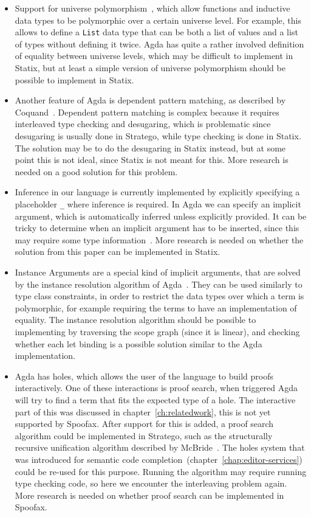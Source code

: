 \begin{itemize}
	\item Support for universe polymorphism~\cite[Universe Levels]{agda}, which allow functions and inductive data types to be polymorphic over a certain universe level. For example, this allows to define a \verb|List| data type that can be both a list of values and a list of types without defining it twice. Agda has quite a rather involved definition of equality between universe levels, which may be difficult to implement in Statix, but at least a simple version of universe polymorphism should be possible to implement in Statix.
	\item Another feature of Agda is dependent pattern matching, as described by Coquand~\cite{patternmatching}. Dependent pattern matching is complex because it requires interleaved type checking and desugaring, which is problematic since desugaring is usually done in Stratego, while type checking is done in Statix. The solution may be to do the desugaring in Statix instead, but at some point this is not ideal, since Statix is not meant for this. More research is needed on a good solution for this problem.
	\item Inference in our language is currently implemented by explicitly specifying a placeholder \verb|_| where inference is required. In Agda we can specify an implicit argument, which is automatically inferred unless explicitly provided. It can be tricky to determine when an implicit argument has to be inserted, since this may require some type information~\cite{implicit_arguments}. More research is needed on whether the solution from this paper can be implemented in Statix.
	\item Instance Arguments are a special kind of implicit arguments, that are solved by the instance resolution algorithm of Agda~\cite[Instance Arguments]{agda}. They can be used similarly to type class constraints, in order to restrict the data types over which a term is polymorphic, for example requiring the terms to have an implementation of equality. The instance resolution algorithm should be possible to implementing by traversing the scope graph (since it is linear), and checking whether each let binding is a possible solution similar to the Agda implementation. 
	\item Agda has holes, which allows the user of the language to build proofs interactively. One of these interactions is proof search, when triggered Agda will try to find a term that fits the expected type of a hole. The interactive part of this was discussed in chapter~\ref{ch:relatedwork}, this is not yet supported by Spoofax. After support for this is added, a proof search algorithm could be implemented in Stratego, such as the structurally recursive unification algorithm described by McBride~\cite{proofsearch}. The holes system that was introduced for semantic code completion~(chapter~\ref{chap:editor-services}) could be re-used for this purpose. Running the algorithm may require running type checking code, so here we encounter the interleaving problem again. More research is needed on whether proof search can be implemented in Spoofax.

\end{itemize}
